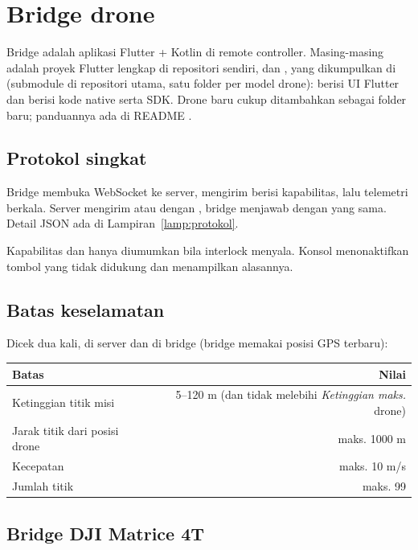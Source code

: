 \chapter{Bridge drone}
Bridge adalah aplikasi Flutter + Kotlin di remote controller. Masing-masing adalah proyek Flutter lengkap di repositori sendiri,  dan , yang dikumpulkan di  (submodule  di repositori utama, satu folder per model drone):  berisi UI Flutter dan  berisi kode native serta SDK. Drone baru cukup ditambahkan sebagai folder  baru; panduannya ada di README .

\section{Protokol singkat}
Bridge membuka WebSocket ke server, mengirim  berisi kapabilitas, lalu telemetri berkala. Server mengirim  atau  dengan , bridge menjawab  dengan  yang sama. Detail JSON ada di Lampiran~\ref{lamp:protokol}.

Kapabilitas  dan  hanya diumumkan bila interlock menyala. Konsol menonaktifkan tombol yang tidak didukung dan menampilkan alasannya.

\section{Batas keselamatan}
Dicek dua kali, di server dan di bridge (bridge memakai posisi GPS terbaru):
\begin{center}
\begin{tabular}{@{}l r@{}}
\toprule
Batas & Nilai \\ \midrule
Ketinggian titik misi & 5--120 m (dan tidak melebihi \emph{Ketinggian maks.} drone) \\
Jarak titik dari posisi drone & maks. 1000 m \\
Kecepatan & maks. 10 m/s \\
Jumlah titik & maks. 99 \\
\bottomrule
\end{tabular}
\end{center}

\section{Bridge DJI Matrice 4T}
